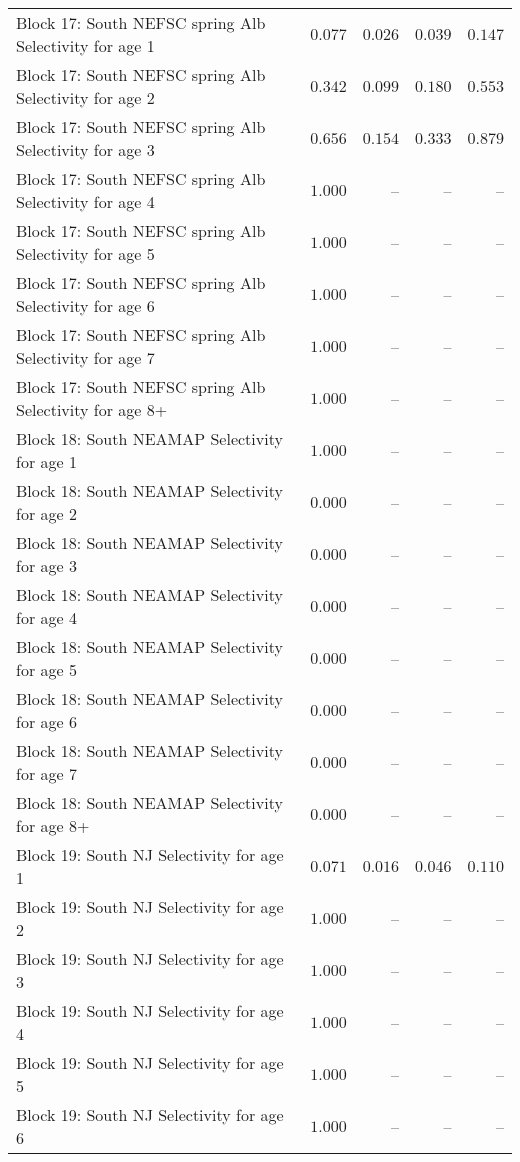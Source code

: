 \documentclass[
]{article}
\begin{document}
\begin{landscape}
\begin{longtable}[t]{lrrrr}
Block 17: South NEFSC spring Alb Selectivity for age 1 & $0.077$ & $0.026$ & $0.039$ & $0.147$\\
Block 17: South NEFSC spring Alb Selectivity for age 2 & $0.342$ & $0.099$ & $0.180$ & $0.553$\\
Block 17: South NEFSC spring Alb Selectivity for age 3 & $0.656$ & $0.154$ & $0.333$ & $0.879$\\
Block 17: South NEFSC spring Alb Selectivity for age 4 & $1.000$ & -- & -- & --\\
\addlinespace
Block 17: South NEFSC spring Alb Selectivity for age 5 & $1.000$ & -- & -- & --\\
Block 17: South NEFSC spring Alb Selectivity for age 6 & $1.000$ & -- & -- & --\\
Block 17: South NEFSC spring Alb Selectivity for age 7 & $1.000$ & -- & -- & --\\
Block 17: South NEFSC spring Alb Selectivity for age 8+ & $1.000$ & -- & -- & --\\
Block 18: South NEAMAP Selectivity for age 1 & $1.000$ & -- & -- & --\\
\addlinespace
Block 18: South NEAMAP Selectivity for age 2 & $0.000$ & -- & -- & --\\
Block 18: South NEAMAP Selectivity for age 3 & $0.000$ & -- & -- & --\\
Block 18: South NEAMAP Selectivity for age 4 & $0.000$ & -- & -- & --\\
Block 18: South NEAMAP Selectivity for age 5 & $0.000$ & -- & -- & --\\
Block 18: South NEAMAP Selectivity for age 6 & $0.000$ & -- & -- & --\\
\addlinespace
Block 18: South NEAMAP Selectivity for age 7 & $0.000$ & -- & -- & --\\
Block 18: South NEAMAP Selectivity for age 8+ & $0.000$ & -- & -- & --\\
Block 19: South NJ Selectivity for age 1 & $0.071$ & $0.016$ & $0.046$ & $0.110$\\
Block 19: South NJ Selectivity for age 2 & $1.000$ & -- & -- & --\\
Block 19: South NJ Selectivity for age 3 & $1.000$ & -- & -- & --\\
\addlinespace
Block 19: South NJ Selectivity for age 4 & $1.000$ & -- & -- & --\\
Block 19: South NJ Selectivity for age 5 & $1.000$ & -- & -- & --\\
Block 19: South NJ Selectivity for age 6 & $1.000$ & -- & -- & --\\

\end{longtable}
\end{landscape}
\end{document}
